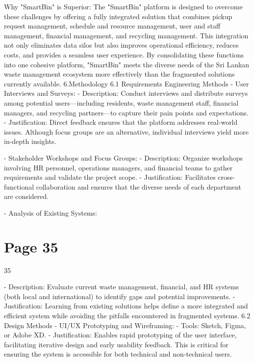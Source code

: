 \documentclass{article}
\begin{document}
Why "SmartBin" is Superior:   
The "SmartBin" platform is designed to overcome these challenges by offering a fully integrated 
solution that combines pickup request management, schedule and resource management, user 
and staff management, financial management, and recycling management. This integration not 
only eliminates data silos but also improves operational efficiency, reduces costs, and provides 
a seamless user experience. By consolidating these functions into one cohesive platform, 
"SmartBin" meets the diverse needs of the Sri Lankan waste management ecosystem more 
effectively than the fragmented solutions currently available. 
6.Methodology 
6.1 Requirements Engineering Methods 
- User Interviews and Surveys:   
  - Description: Conduct interviews and distribute surveys among potential users—including 
residents, waste management staff, financial managers, and recycling partners—to capture 
their pain points and expectations.   
  - Justification: Direct feedback ensures that the platform addresses real-world issues. Although 
focus groups are an alternative, individual interviews yield more in-depth insights. 
 
- Stakeholder Workshops and Focus Groups:   
  - Description: Organize workshops involving HR personnel, operations managers, and financial 
teams to gather requirements and validate the project scope.   
  - Justification: Facilitates cross-functional collaboration and ensures that the diverse needs of 
each department are considered. 
 
- Analysis of Existing Systems:   

\section*{Page 35}
   
 
 35  
 
  - Description: Evaluate current waste management, financial, and HR systems (both local and 
international) to identify gaps and potential improvements.   
  - Justification: Learning from existing solutions helps define a more integrated and efficient 
system while avoiding the pitfalls encountered in fragmented systems. 
6.2 Design Methods 
- UI/UX Prototyping and Wireframing:   
  - Tools: Sketch, Figma, or Adobe XD.   
  - Justification: Enables rapid prototyping of the user interface, facilitating iterative design and 
early usability feedback. This is critical for ensuring the system is accessible for both technical 
and non-technical users. 
 
\end{document}
